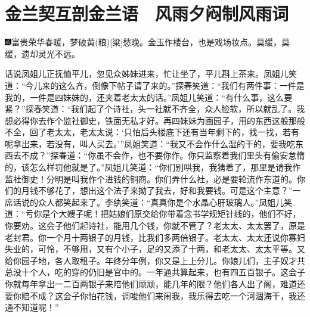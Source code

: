 

\chapter{金兰契互剖金兰语　风雨夕闷制风雨词}

{\includegraphics[width=3mm]{../Images/00005}富贵荣华春暖，梦破黄{{(粮)}}{[}粱{]}愁晚。金玉作楼台，也是戏场妆点。莫缓，莫缓，遗却灵光不远。}

话说凤姐儿正抚恤平儿，忽见众姊妹进来，忙让坐了，平儿斟上茶来。凤姐儿笑道：``今儿来的这么齐，倒像下帖子请了来的。''探春笑道：``我们有两件事：一件是我的，一件是四妹妹的，还夹着老太太的话。''凤姐儿笑道：``有什么事，这么要紧？''探春笑道：``我们起了个诗社，头一社就不齐全，众人脸软，所以就乱了。我想必得你去作个监社御史，铁面无私才好。再四妹妹为画园子，用的东西这般那般不全，回了老太太，老太太说：`只怕后头楼底下还有当年剩下的，找一找，若有呢拿出来，若没有，叫人买去。'''凤姐笑道：``我又不会作什么湿的干的，要我吃东西去不成？''探春道：``你虽不会作，也不要你作。你只监察着我们里头有偷安怠惰的，该怎么样罚他就是了。''凤姐儿笑道：``你们别哄我，我猜着了，那里是请我作监社御史！分明是叫我作个进钱的铜商。你们弄什么社，必是要轮流作东道的。你们的月钱不够花了，想出这个法子来拗了我去，好和我要钱。可是这个主意？''一席话说的众人都笑起来了。李纨笑道：``真真你是个水晶心肝玻璃人。''凤姐儿笑道：``亏你是个大嫂子呢！把姑娘们原交给你带着念书学规矩针线的，他们不好，你要劝。这会子他们起诗社，能用几个钱，你就不管了？老太太、太太罢了，原是老封君。你一个月十两银子的月钱，比我们多两倍银子。老太太、太太还说你寡妇失业的，可怜，不够用，又有个小子，足的又添了十两，和老太太、太太平等。又给你园子地，各人取租子。年终分年例，你又是上上分儿。你娘儿们，主子奴才共总没十个人，吃的穿的仍旧是官中的。一年通共算起来，也有四五百银子。这会子你就每年拿出一二百两银子来陪他们顽顽，能几年的限？他们各人出了阁，难道还要你赔不成？这会子你怕花钱，调唆他们来闹我，我乐得去吃一个河涸海干，我还通不知道呢！''

